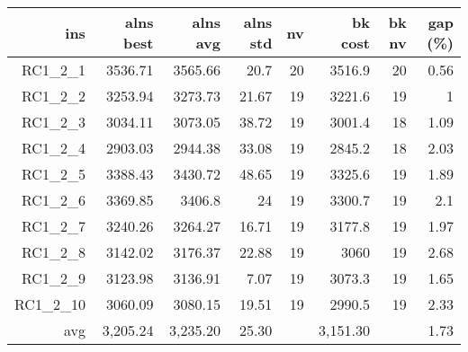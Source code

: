  \begin{table}[caption={Kết quả đo với tập HG\_RC\_1\_2 200 yêu cầu}, label=exp:HGRC12]
    \small
    \centering
    \begin{tabular}{rrrrrrrr}
    \hline
    ins & alns best & alns avg & alns std & nv & bk cost & bk nv & gap (\%) \\ \hline
    RC1\_2\_1 & 3536.71 & 3565.66 & 20.7 & 20 & 3516.9 & 20 & 0.56 \\ \hline
    RC1\_2\_2 & 3253.94 & 3273.73 & 21.67 & 19 & 3221.6 & 19 & 1 \\ \hline
    RC1\_2\_3 & 3034.11 & 3073.05 & 38.72 & 19 & 3001.4 & 18 & 1.09 \\ \hline
    RC1\_2\_4 & 2903.03 & 2944.38 & 33.08 & 19 & 2845.2 & 18 & 2.03 \\ \hline
    RC1\_2\_5 & 3388.43 & 3430.72 & 48.65 & 19 & 3325.6 & 19 & 1.89 \\ \hline
    RC1\_2\_6 & 3369.85 & 3406.8 & 24 & 19 & 3300.7 & 19 & 2.1 \\ \hline
    RC1\_2\_7 & 3240.26 & 3264.27 & 16.71 & 19 & 3177.8 & 19 & 1.97 \\ \hline
    RC1\_2\_8 & 3142.02 & 3176.37 & 22.88 & 19 & 3060 & 19 & 2.68 \\ \hline
    RC1\_2\_9 & 3123.98 & 3136.91 & 7.07 & 19 & 3073.3 & 19 & 1.65 \\ \hline
    RC1\_2\_10 & 3060.09 & 3080.15 & 19.51 & 19 & 2990.5 & 19 & 2.33 \\ \hline
    avg & 3,205.24 & 3,235.20 & 25.30 & & 3,151.30 & & 1.73 \\ \hline
    \end{tabular}
  \end{table}


